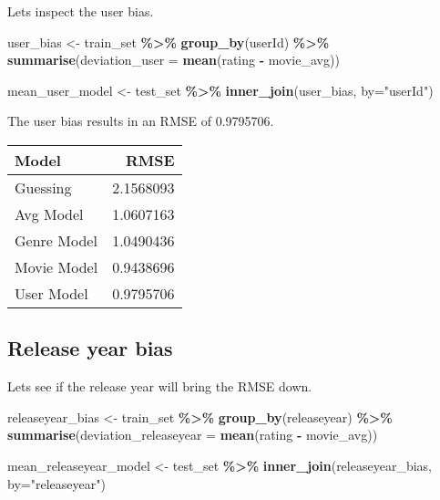 \documentclass[
]{article}
\newenvironment{Shaded}{\begin{snugshade}}{\end{snugshade}}
\newcommand{\AttributeTok}[1]{\textcolor[rgb]{0.13,0.29,0.53}{#1}}
\newcommand{\FunctionTok}[1]{\textcolor[rgb]{0.13,0.29,0.53}{\textbf{#1}}}
\newcommand{\NormalTok}[1]{#1}
\newcommand{\OtherTok}[1]{\textcolor[rgb]{0.56,0.35,0.01}{#1}}
\newcommand{\SpecialCharTok}[1]{\textcolor[rgb]{0.81,0.36,0.00}{\textbf{#1}}}
\newcommand{\StringTok}[1]{\textcolor[rgb]{0.31,0.60,0.02}{#1}}
\begin{document}
Lets inspect the user bias.

\begin{Shaded}
\begin{Highlighting}[]
\NormalTok{user\_bias }\OtherTok{\textless{}{-}}\NormalTok{ train\_set }\SpecialCharTok{\%\textgreater{}\%}
  \FunctionTok{group\_by}\NormalTok{(userId) }\SpecialCharTok{\%\textgreater{}\%}
  \FunctionTok{summarise}\NormalTok{(}\AttributeTok{deviation\_user =} \FunctionTok{mean}\NormalTok{(rating }\SpecialCharTok{{-}}\NormalTok{ movie\_avg))}

\NormalTok{mean\_user\_model }\OtherTok{\textless{}{-}}\NormalTok{ test\_set }\SpecialCharTok{\%\textgreater{}\%}
  \FunctionTok{inner\_join}\NormalTok{(user\_bias, }\AttributeTok{by=}\StringTok{"userId"}\NormalTok{)}
\end{Highlighting}
\end{Shaded}

The user bias results in an RMSE of 0.9795706.

\begin{tabular}{l|r}
\hline
Model & RMSE\\
\hline
Guessing & 2.1568093\\
\hline
Avg Model & 1.0607163\\
\hline
Genre Model & 1.0490436\\
\hline
Movie Model & 0.9438696\\
\hline
User Model & 0.9795706\\
\hline
\end{tabular}

\hypertarget{release-year-bias}{%
\subsection{Release year bias}\label{release-year-bias}}

Lets see if the release year will bring the RMSE down.

\begin{Shaded}
\begin{Highlighting}[]
\NormalTok{releaseyear\_bias }\OtherTok{\textless{}{-}}\NormalTok{ train\_set }\SpecialCharTok{\%\textgreater{}\%}
  \FunctionTok{group\_by}\NormalTok{(releaseyear) }\SpecialCharTok{\%\textgreater{}\%}
  \FunctionTok{summarise}\NormalTok{(}\AttributeTok{deviation\_releaseyear =} \FunctionTok{mean}\NormalTok{(rating }\SpecialCharTok{{-}}\NormalTok{ movie\_avg))}

\NormalTok{mean\_releaseyear\_model }\OtherTok{\textless{}{-}}\NormalTok{ test\_set }\SpecialCharTok{\%\textgreater{}\%}
  \FunctionTok{inner\_join}\NormalTok{(releaseyear\_bias, }\AttributeTok{by=}\StringTok{"releaseyear"}\NormalTok{)}
\end{Highlighting}
\end{Shaded}
\end{document}
